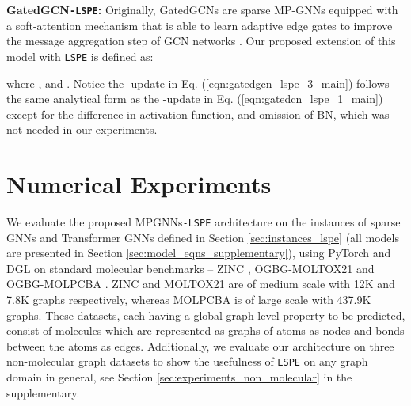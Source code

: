 \documentclass{article} \usepackage{iclr2021_conference,times}
\begin{document}
{\bf GatedGCN\texttt{-LSPE}:}
Originally, GatedGCNs are sparse MP-GNNs equipped with a soft-attention mechanism that is able to learn adaptive edge gates to improve the message aggregation step of GCN networks \citep{kipf2017semi}. Our proposed extension of this model with \texttt{LSPE} is defined as:

where , 
 and . Notice the -update in Eq. (\ref{eqn:gatedgcn_lspe_3_main}) follows the same analytical form as the -update in Eq. (\ref{eqn:gatedcn_lspe_1_main}) except for the difference in activation function, and omission of BN, which was not needed in our experiments.




 


\section{Numerical Experiments}
\label{sec:numerical_experiments}
We evaluate the proposed MPGNNs\texttt{-LSPE} architecture on the instances of sparse GNNs and Transformer GNNs defined in Section \ref{sec:instances_lspe} (all models 
are
presented in Section \ref{sec:model_eqns_supplementary}), using PyTorch \citep{paszke2019pytorch} and DGL \citep{wang2019deep} on standard molecular benchmarks -- ZINC \citep{irwin2012zinc}, OGBG-MOLTOX21 and OGBG-MOLPCBA \citep{hu2020ogb}. 
ZINC and MOLTOX21 are of medium scale with 12K and 7.8K graphs respectively, whereas MOLPCBA is of large scale with 437.9K graphs.
These datasets, each having a global graph-level property to be predicted, consist of molecules which are represented as graphs of atoms as nodes and bonds between the atoms as edges.
Additionally, we evaluate our architecture on three non-molecular graph datasets to show the usefulness of \texttt{LSPE} on any graph domain in general, see Section \ref{sec:experiments_non_molecular} in the supplementary.
\end{document}
